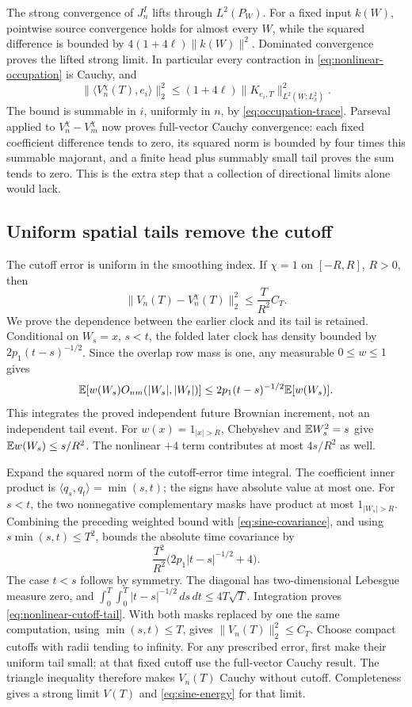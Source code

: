 \documentclass[11pt]{article}
\begin{document}
The strong convergence of $J_n^I$ lifts through $L^2(P_W)$.
For a fixed input $k(W)$, pointwise source convergence holds for
almost every $W$, while the squared difference is bounded by
$4(1+4\ell)\|k(W)\|^2$. Dominated convergence proves the lifted
strong limit. In particular every contraction in
\eqref{eq:nonlinear-occupation} is Cauchy, and
\[
 \|\langle V_n^\chi(T),e_i\rangle\|_2^2
 \leq(1+4\ell)\|K_{e_i,T}\|_{L^2(W;L^2_x)}^2.
\]
The bound is summable in $i$, uniformly in $n$, by
\eqref{eq:occupation-trace}. Parseval applied to
$V_n^\chi-V_m^\chi$ now proves full-vector Cauchy convergence:
each fixed coefficient difference tends to zero, its squared norm
is bounded by four times this summable majorant, and a finite head
plus summably small tail proves the sum tends to zero. This is the
extra step that a collection of directional limits alone would lack.

\subsection{Uniform spatial tails remove the cutoff}
The cutoff error is uniform in the smoothing index. If
$\chi=1$ on $[-R,R]$, $R>0$, then
\begin{equation}\label{eq:nonlinear-cutoff-tail}
 \|V_n(T)-V_n^\chi(T)\|_2^2\leq\frac{T}{R^2}C_T.
\end{equation}
We prove the dependence between the earlier clock and its tail is
retained. Conditional on $W_s=x$, $s<t$, the folded later clock has
density bounded by $2p_1(t-s)^{-1/2}$. Since the overlap row mass is
one, any measurable $0\leq w\leq1$ gives
\[
 \mathbb E[w(W_s)O_{nm}(|W_s|,|W_t|)]
 \leq2p_1(t-s)^{-1/2}\mathbb E[w(W_s)].
\]
This integrates the proved independent future Brownian increment,
not an independent tail event. For $w(x)=1_{|x|>R}$, Chebyshev and
$\mathbb E W_s^2=s$ give $\mathbb E w(W_s)\leq s/R^2$. The nonlinear $+4$
term contributes at most $4s/R^2$ as well.

Expand the squared norm of the cutoff-error time integral.
The coefficient inner product is $\langle q_s,q_t\rangle=\min(s,t)$;
the signs have absolute value at most one. For $s<t$, the two
nonnegative complementary masks have product at most
$1_{|W_s|>R}$. Combining the preceding weighted bound with
\eqref{eq:sine-covariance}, and using $s\min(s,t)\leq T^2$, bounds
the absolute time covariance by
\[
 \frac{T^2}{R^2}\bigl(2p_1|t-s|^{-1/2}+4\bigr).
\]
The case $t<s$ follows by symmetry. The diagonal has two-dimensional
Lebesgue measure zero, and
$\int_0^T\int_0^T|t-s|^{-1/2}\,ds\,dt\leq4T\sqrt T$.
Integration proves \eqref{eq:nonlinear-cutoff-tail}. With both masks
replaced by one the same computation, using $\min(s,t)\leq T$,
gives $\|V_n(T)\|_2^2\leq C_T$.
Choose compact cutoffs with radii tending to infinity. For any
prescribed error, first make their uniform tail small; at that fixed
cutoff use the full-vector Cauchy result. The triangle inequality
therefore makes $V_n(T)$ Cauchy without cutoff. Completeness gives
a strong limit $V(T)$ and \eqref{eq:sine-energy} for that limit.
\end{document}
